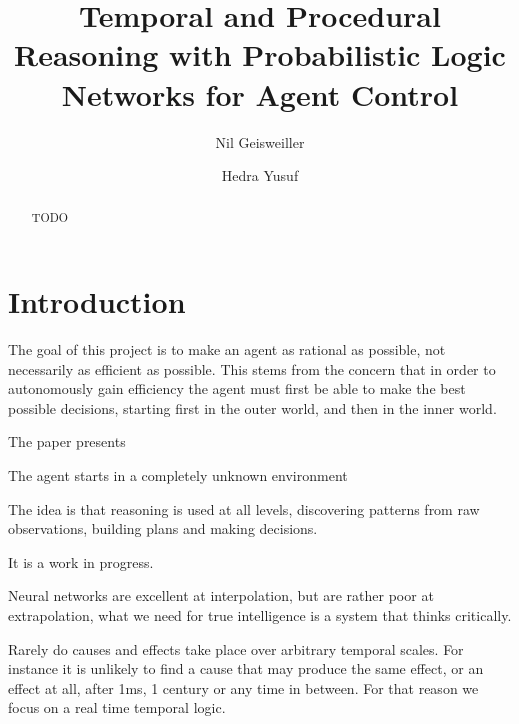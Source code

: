 \documentclass[runningheads]{llncs}
\begin{document}
%
\title{Temporal and Procedural Reasoning with Probabilistic Logic
  Networks for Agent Control}

%
\author{Nil Geisweiller
  \and Hedra Yusuf}
%
%
%
\maketitle              %
%

\begin{abstract}
  TODO

\end{abstract}

\section{Introduction}

The goal of this project is to make an agent as rational as possible,
not necessarily as efficient as possible.  This stems from the concern
that in order to autonomously gain efficiency the agent must first be
able to make the best possible decisions, starting first in the outer
world, and then in the inner world.

The paper presents

The agent starts in a completely unknown environment

The idea is that reasoning is used at all levels, discovering patterns
from raw observations, building plans and making decisions.

It is a work in progress.

Neural networks are excellent at interpolation, but are rather poor at
extrapolation, what we need for true intelligence is a system that
thinks critically.

Rarely do causes and effects take place over arbitrary temporal
scales.  For instance it is unlikely to find a cause that may produce
the same effect, or an effect at all, after 1ms, 1 century or any time
in between.  For that reason we focus on a real time temporal logic.
\end{document}
